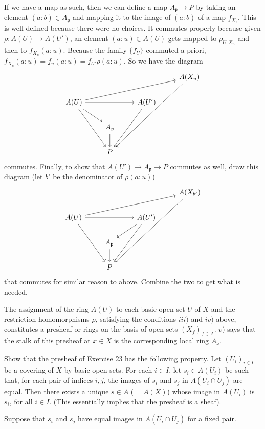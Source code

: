 \documentclass[a4paper]{exam}
\begin{document}
\begin{questions}
\begin{enumerate}
\begin{solution}
	If we have a map as such, then we can define a map $A_{\mathfrak{p}} \to P $ by taking an element $(a:b) \in A_{\mathfrak{p}} $ and mapping it to the image of $(a:b) $ of a map $f_{X_b} $.
	This is well-defined because there were no choices.
	It commutes properly because given $\rho: A(U) \to A(U') $, an element $(a:u) \in A(U) $ gets mapped to $\rho_{U, X_u}$ and then to $f_{X_u}(a:u) $.
	Because the family $\{f_U\}   $ commuted a priori, $f_{X_u}(a:u) = f_u(a:u) = f_{U'}\rho(a:u)$.
	So we have the diagram
	\[
		\begin{tikzcd}
			& & &A(X_u)\\
			A(U) & & A(U')&\\
			     & A_{\mathfrak{p}} &&\\
			     &P&&
		\arrow[from=2-1,to=1-4]
		\arrow[from=2-1,to=2-3]
		\arrow[from=2-1,to=3-2]
		\arrow[from=2-1,to=4-2]
		\arrow[from=1-4,to=4-2]
		\arrow[from=3-2,to=4-2]
		\arrow[from=2-3,to=4-2]
		\end{tikzcd}
	\] 
	commutes.
	Finally, to show that $A(U') \to A_{\mathfrak{p}} \to P $ commutes as well, draw this diagram (let $b' $ be the denominator of $\rho(a:u) $)
	\[
		\begin{tikzcd}
			& & &A(X_{b'})\\
			A(U) & & A(U')&\\
			     & A_{\mathfrak{p}} &&\\
			     &P&&
		\arrow[from=2-1,to=1-4]
		\arrow[from=2-1,to=2-3]
		\arrow[from=2-1,to=4-2]
		\arrow[from=1-4,to=4-2]
		\arrow[from=3-2,to=4-2]
		\arrow[from=2-3,to=4-2]
		\arrow[from=2-3,to=3-2]
		\end{tikzcd}
	\] 
	that commutes for similar reason to above.
	Combine the two to get what is needed.
\end{solution}
The assignment of the ring $A(U) $ to each basic open set $U $ of $X $ and the restriction homomorphisms $\rho $, satisfying the conditions $iii) $ and $iv) $ above, constitutes a presheaf or rings on the basis of open sets $(X_f)_{f\in A} $. $v) $ says that the stalk of this presheaf at $x\in X $ is the corresponding local ring $A_{\mathfrak{p}} $.
\end{enumerate}

\question Show that the presheaf of Exercise 23 has the following property. Let $(U_i)_{i\in I} $ be a covering of $X $ by basic open sets. For each $i\in I $, let $s_i \in A(U_i) $ be such that, for each pair of indices $i,j $, the images of $s_i $ and $s_j $ in $A(U_i \cap U_j) $ are equal. Then there exists a unique $s\in A $ ($= A(X) $) whose image in $A(U_i) $ is $s_i $, for all $i\in I $. (This essentially implies that the presheaf is a sheaf).
\begin{solution}
	Suppose that $s_i $ and $s_j $ have equal images in $A(U_i \cap U_j) $ for a fixed pair.
\end{solution}


\end{questions}
\end{document}
